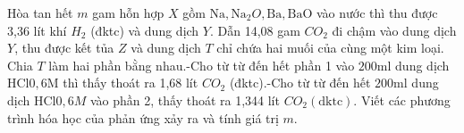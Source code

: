 \begin{vd}
	Hòa tan hết $m$ gam hỗn hợp $X$ gồm $\mathrm{Na}, \mathrm{Na}_2 O, \mathrm{Ba}, \mathrm{BaO}$ vào nước thì thu được 3,36 lít khí $H_2$ (đktc) và dung dịch $Y$. Dẫn 14,08 gam $CO_2$ đi chậm vào dung dịch $Y$, thu được kết tủa $Z$ và dung dịch $T$ chỉ chứa hai muối của cùng một kim loại. Chia $T$ làm hai phần bằng nhau.-Cho từ từ đến hết phần 1 vào $200\mathrm{ml}$ dung dịch $\mathrm{HCl} \mathrm{0,6M}$ thì thấy thoát ra 1,68 lít $CO_2$ (đktc).-Cho từ từ đến hết $200\mathrm{ml}$ dung dịch $\mathrm{HCl} 0,6M$ vào phần 2, thấy thoát ra 1,344 lít $CO_2(\mathrm{dktc})$.
	Viết các phương trình hóa học của phản ứng xảy ra và tính giá trị $m$.
	\loigiai{
}
\end{vd}
